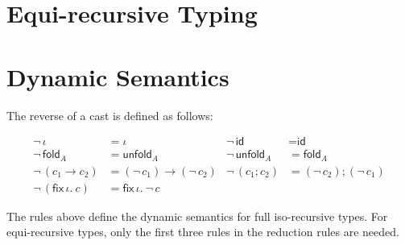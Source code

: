 \documentclass[a4paper]{article}
\newcommand{\cid}{\textsf{id}}
\newcommand{\cfold}[1]{\textsf{fold}_{#1}}
\newcommand{\cunfold}[1]{\textsf{unfold}_{#1}}
\newcommand{\cseq}[2]{#1 ; #2}
\newcommand{\cfix}[2]{\textsf{fix}\,{#1}.~#2}
\begin{document}
\ottdefnsWellFormedType

\ottdefnsTypCast


\ottdefnsTyping

\section{Equi-recursive Typing}

\ottdefnseqe

\ottdefnsEquiTyping

\ottdefnsEquiTypingC


\section{Dynamic Semantics}

The reverse of a cast is defined as follows:

$$
\begin{array}{llll}
  \neg\, \iota &= \iota & 
  \neg\, \cid &= \cid \\
  \neg\, \cfold{A} &= \cunfold{A} & 
  \neg\, \cunfold{A} &= \cfold{A} \\
  \neg\, (c_1 \to c_2) &= (\neg\, c_1) \to (\neg\, c_2) & 
  \neg\, (\cseq{c_1}{c_2}) &= \cseq{(\neg\, c_2)}{(\neg\, c_1)} \\
  \neg\, (\cfix{\iota}{c}) &= \cfix{\iota}{\neg\, c}  
\end{array}
$$



\ottdefnsValues


\ottdefnsReduction

The rules above define the dynamic semantics for full iso-recursive types.
For equi-recursive types, only the first three rules in the reduction rules are needed.
\end{document}
